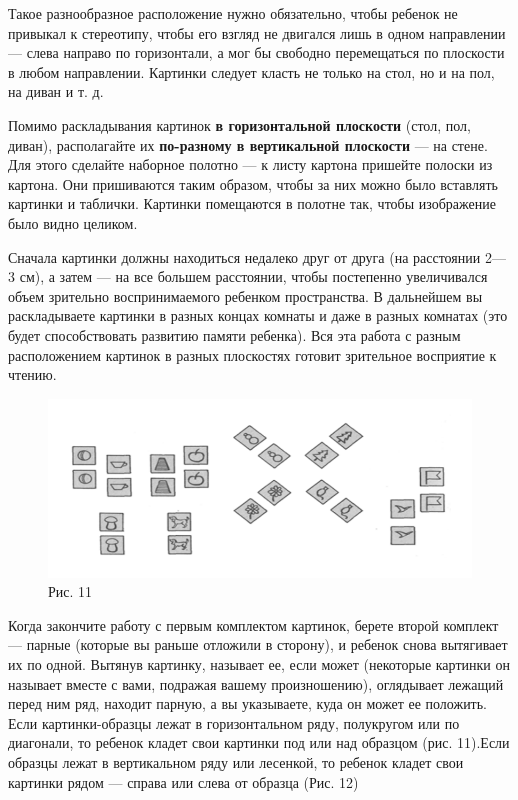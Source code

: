\documentclass{book}
\begin{document}
Такое разнообразное расположение нужно обязательно, чтобы ребенок не
привыкал к стереотипу, чтобы его взгляд не двигался лишь в одном
направлении --- слева направо по горизонтали, а мог бы свободно
перемещаться по плоскости в любом направлении. Картинки следует класть
не только на стол, но и на пол, на диван и т. д.

Помимо раскладывания картинок \textbf{в горизонтальной плоскости} (стол,
пол, диван), располагайте их \textbf{по-разному в вертикальной
плоскости} --- на стене. Для этого сделайте наборное полотно --- к листу
картона пришейте полоски из картона. Они пришиваются таким образом,
чтобы за них можно было вставлять картинки и таблички. Картинки
помещаются в полотне так, чтобы изображение было видно целиком.

Сначала картинки должны находиться недалеко друг от друга (на расстоянии
2---3 см), а затем --- на все большем расстоянии, чтобы постепенно
увеличивался объем зрительно воспринимаемого ребенком пространства. В
дальнейшем вы раскладываете картинки в разных концах комнаты и даже в
разных комнатах (это будет способствовать развитию памяти ребенка). Вся
эта работа с разным расположением картинок в разных плоскостях готовит
зрительное восприятие к чтению.

\begin{figure}
\centering
\includegraphics[width=\linewidth]{media/media/image11.png}
\caption*{Рис. 11}
\end{figure}

Когда закончите работу с первым комплектом картинок, берете второй
комплект --- парные (которые вы раньше отложили в сторону), и ребенок
снова вытягивает их по одной. Вытянув картинку, называет ее, если может
(некоторые картинки он называет вместе с вами, подражая вашему
произношению), оглядывает лежащий перед ним ряд, находит парную, а вы
указываете, куда он может ее положить. Если картинки-образцы лежат в
горизонтальном ряду, полукругом или по диагонали, то ребенок кладет свои
картинки под или над образцом (рис. 11).Если образцы лежат в
вертикальном ряду или лесенкой, то ребенок кладет свои картинки рядом
--- справа или слева от образца (Рис. 12)
\end{document}
